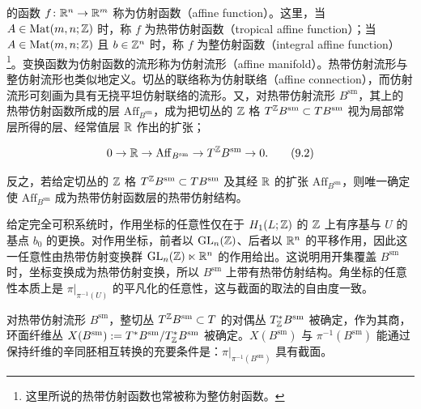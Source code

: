 
的函数 $f\colon\mathbb{R}^n\to\mathbb{R}^m$ 称为仿射函数（affine function）。这里，当 $A\in\operatorname{Mat}(m,n;\mathbb{Z})$ 时，称 $f$ 为热带仿射函数（tropical affine function）；当 $A\in\operatorname{Mat}(m,n;\mathbb{Z})$ 且 $b\in\mathbb{Z}^n$ 时，称 $f$ 为整仿射函数（integral affine function）\footnote{这里所说的热带仿射函数也常被称为整仿射函数。}。变换函数为仿射函数的流形称为仿射流形（affine manifold）。热带仿射流形与整仿射流形也类似地定义。切丛的联络称为仿射联络（affine connection），而仿射流形可刻画为具有无挠平坦仿射联络的流形。又，对热带仿射流形 $B^{\mathrm{sm}}$，其上的热带仿射函数所成的层 $\mathrm{Aff}_{B^{\mathrm{sm}}}$，成为把切丛的 $\mathbb{Z}$ 格 $T^{\mathbb{Z}}B^{\mathrm{sm}}\subset TB^{\mathrm{sm}}$ 视为局部常层所得的层、经常值层 $\mathbb{R}$ 作出的扩张；

\begin{equation}
    0\to\mathbb{R}\to\mathrm{Aff}_{B^{\mathrm{sm}}}\to T^{\mathbb{Z}}B^{\mathrm{sm}}\to 0. \tag{9.2}
\end{equation}

反之，若给定切丛的 $\mathbb{Z}$ 格 $T^{\mathbb{Z}}B^{\mathrm{sm}}\subset TB^{\mathrm{sm}}$ 及其经 $\mathbb{R}$ 的扩张 $\mathrm{Aff}_{B^{\mathrm{sm}}}$，则唯一确定使 $\mathrm{Aff}_{B^{\mathrm{sm}}}$ 成为热带仿射函数层的热带仿射结构。

给定完全可积系统时，作用坐标的任意性仅在于 $H_1(L;\mathbb{Z})$ 的 $\mathbb{Z}$ 上有序基与 $U$ 的基点 $b_0$ 的更换。对作用坐标，前者以 $\mathrm{GL}_n(\mathbb{Z})$、后者以 $\mathbb{R}^n$ 的平移作用，因此这一任意性由热带仿射变换群 $\mathrm{GL}_n(\mathbb{Z})\ltimes\mathbb{R}^n$ 的作用给出。这说明用开集覆盖 $B^{\mathrm{sm}}$ 时，坐标变换成为热带仿射变换，所以 $B^{\mathrm{sm}}$ 上带有热带仿射结构。角坐标的任意性本质上是 $\pi|_{\pi^{-1}(U)}$ 的平凡化的任意性，这与截面的取法的自由度一致。

对热带仿射流形 $B^{\mathrm{sm}}$，整切丛 $T^{\mathbb{Z}}B^{\mathrm{sm}}\subset T$ 的对偶丛 $T^{*}_{\mathbb{Z}}B^{\mathrm{sm}}$ 被确定，作为其商，环面纤维丛 $X(B^{\mathrm{sm}}):=T^{*}B^{\mathrm{sm}}/T^{*}_{\mathbb{Z}}B^{\mathrm{sm}}$ 被确定。$X(B^{\mathrm{sm}})$ 与 $\pi^{-1}(B^{\mathrm{sm}})$ 能通过保持纤维的辛同胚相互转换的充要条件是：$\pi|_{\pi^{-1}(B^{\mathrm{sm}})}$ 具有截面。


